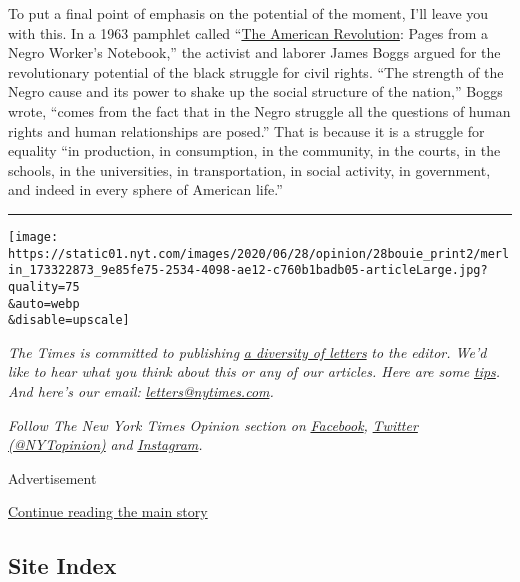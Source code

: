 To put a final point of emphasis on the potential of the moment, I'll
leave you with this. In a 1963 pamphlet called
``\href{https://books.google.com/books/about/The_American_revolution.html?id=p2MOAQAAMAAJ}{The
American Revolution}: Pages from a Negro Worker's Notebook,'' the
activist and laborer James Boggs argued for the revolutionary potential
of the black struggle for civil rights. ``The strength of the Negro
cause and its power to shake up the social structure of the nation,''
Boggs wrote, ``comes from the fact that in the Negro struggle all the
questions of human rights and human relationships are posed.'' That is
because it is a struggle for equality ``in production, in consumption,
in the community, in the courts, in the schools, in the universities, in
transportation, in social activity, in government, and indeed in every
sphere of American life.''

\begin{center}\rule{0.5\linewidth}{\linethickness}\end{center}

\texttt{[image: https://static01.nyt.com/images/2020/06/28/opinion/28bouie\_print2/merlin\_173322873\_9e85fe75-2534-4098-ae12-c760b1badb05-articleLarge.jpg?quality=75\\\&auto=webp\\\&disable=upscale]}

\emph{The Times is committed to publishing}
\href{https://www.nytimes.com/2019/01/31/opinion/letters/letters-to-editor-new-york-times-women.html}{\emph{a
diversity of letters}} \emph{to the editor. We'd like to hear what you
think about this or any of our articles. Here are some}
\href{https://help.nytimes.com/hc/en-us/articles/115014925288-How-to-submit-a-letter-to-the-editor}{\emph{tips}}\emph{.
And here's our email:}
\href{mailto:letters@nytimes.com}{\emph{letters@nytimes.com}}\emph{.}

\emph{Follow The New York Times Opinion section on}
\href{https://www.facebook.com/nytopinion}{\emph{Facebook}}\emph{,}
\href{http://twitter.com/NYTOpinion}{\emph{Twitter (@NYTopinion)}}
\emph{and}
\href{https://www.instagram.com/nytopinion/}{\emph{Instagram}}\emph{.}

Advertisement

\protect\hyperlink{after-bottom}{Continue reading the main story}

\hypertarget{site-index}{%
\subsection{Site Index}\label{site-index}}

